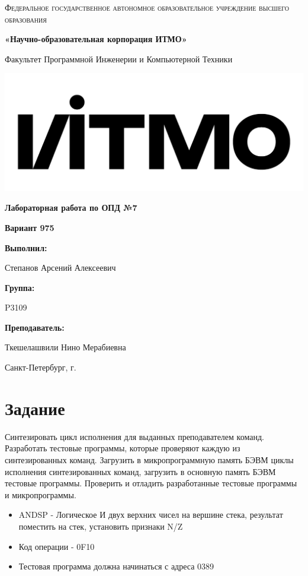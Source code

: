 \documentclass[12pt,a4paper]{report}
\begin{document}
\begin{titlepage} 
	\centering
	{
        \scshape
        Федеральное государственное автономное образовательное учреждение высшего образования
        \par
        \textbf{«Научно-образовательная корпорация ИТМО»}
        \par
        \vspace*{1cm}
        Факультет Программной Инженерии и Компьютерной Техники
        \par
    }
    \vspace*{0.6cm}
    \includegraphics[width=\textwidth]{logo.png}
    {
        \Large
        \textbf{Лабораторная работа по ОПД №7}
        \par
        \normalsize
        \vspace*{0.75cm}
        \textbf{Вариант 975}
        \par
    }
    \vfill
    \hfill\begin{minipage}{\dimexpr\textwidth-7.8cm}
        \textbf{Выполнил:}\par
        Степанов Арсений Алексеевич\par
        \vspace*{0.15cm}
        \textbf{Группа:}\par
        P3109\par
        \vspace*{0.15cm}
        \textbf{Преподаватель:}\par
        Ткешелашвили Нино Мерабиевна\par
    \end{minipage}
    \vfill
    Санкт-Петербург, \the\year{}г.
\end{titlepage}  
\section*{Задание}
Синтезировать цикл исполнения для выданных преподавателем команд. Разработать тестовые программы, которые проверяют каждую из синтезированных команд. Загрузить в микропрограммную память БЭВМ циклы исполнения синтезированных команд, загрузить в основную память БЭВМ тестовые программы. Проверить и отладить разработанные тестовые программы и микропрограммы.
\begin{itemize}
    \item ANDSP - Логическое И двух верхних чисел на вершине стека, результат поместить на стек, установить признаки N/Z
    \item Код операции - 0F10
    \item Тестовая программа должна начинаться с адреса 0389
\end{itemize}
\end{document}
